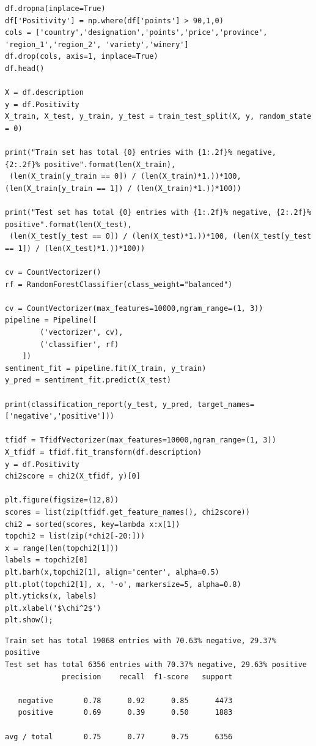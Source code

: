 \documentclass[11pt]{article} %
\begin{document}
\begin{lstlisting}
df.dropna(inplace=True)
df['Positivity'] = np.where(df['points'] > 90,1,0)
cols = ['country','designation','points','price','province', 'region_1','region_2', 'variety','winery']
df.drop(cols, axis=1, inplace=True)
df.head()

X = df.description
y = df.Positivity
X_train, X_test, y_train, y_test = train_test_split(X, y, random_state = 0)

print("Train set has total {0} entries with {1:.2f}% negative, {2:.2f}% positive".format(len(X_train),
 (len(X_train[y_train == 0]) / (len(X_train)*1.))*100, (len(X_train[y_train == 1]) / (len(X_train)*1.))*100))

print("Test set has total {0} entries with {1:.2f}% negative, {2:.2f}% positive".format(len(X_test),
 (len(X_test[y_test == 0]) / (len(X_test)*1.))*100, (len(X_test[y_test == 1]) / (len(X_test)*1.))*100))

cv = CountVectorizer()
rf = RandomForestClassifier(class_weight="balanced")

cv = CountVectorizer(max_features=10000,ngram_range=(1, 3))
pipeline = Pipeline([
        ('vectorizer', cv),
        ('classifier', rf)
    ])
sentiment_fit = pipeline.fit(X_train, y_train)
y_pred = sentiment_fit.predict(X_test)

print(classification_report(y_test, y_pred, target_names=['negative','positive']))

tfidf = TfidfVectorizer(max_features=10000,ngram_range=(1, 3))
X_tfidf = tfidf.fit_transform(df.description)
y = df.Positivity
chi2score = chi2(X_tfidf, y)[0]

plt.figure(figsize=(12,8))
scores = list(zip(tfidf.get_feature_names(), chi2score))
chi2 = sorted(scores, key=lambda x:x[1])
topchi2 = list(zip(*chi2[-20:]))
x = range(len(topchi2[1]))
labels = topchi2[0]
plt.barh(x,topchi2[1], align='center', alpha=0.5)
plt.plot(topchi2[1], x, '-o', markersize=5, alpha=0.8)
plt.yticks(x, labels)
plt.xlabel('$\chi^2$')
plt.show();
\end{lstlisting}
\begin{lstlisting}
Train set has total 19068 entries with 70.63% negative, 29.37% positive
Test set has total 6356 entries with 70.37% negative, 29.63% positive
             precision    recall  f1-score   support
 
   negative       0.78      0.92      0.85      4473
   positive       0.69      0.39      0.50      1883
 
avg / total       0.75      0.77      0.75      6356
\end{lstlisting}
\end{document}
